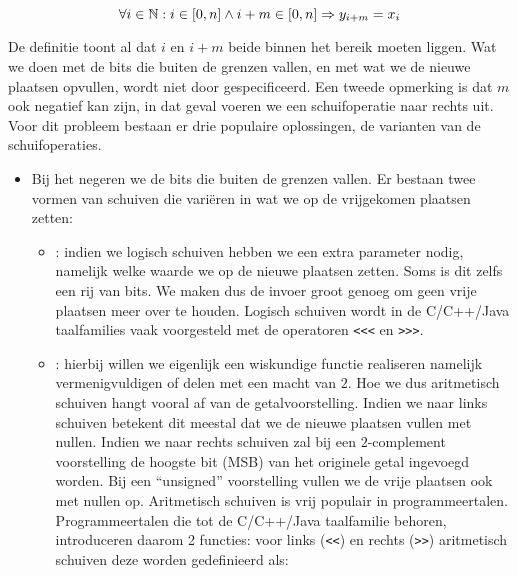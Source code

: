 \begin{equation}
\forall i\in\NN:i\in\left[0,n\right]\wedge i+m\in\left[0,n\right]\Rightarrow y_{i+m}=x_i
\eqnlab{shiftFormal}
\end{equation}

De definitie toont al dat $i$ en $i+m$ beide binnen het bereik moeten liggen. Wat we doen met de bits die buiten de grenzen vallen, en met wat we de nieuwe plaatsen opvullen, wordt niet door  gespecificeerd. Een tweede opmerking is dat $m$ ook negatief kan zijn, in dat geval voeren we een schuifoperatie naar rechts uit. Voor dit probleem bestaan er drie populaire oplossingen, de varianten van de schuifoperaties.
\begin{itemize}
 \item Bij het  negeren we de bits die buiten de grenzen vallen. Er bestaan twee vormen van schuiven die vari\"eren in wat we op de vrijgekomen plaatsen zetten:
 \begin{itemize}
   \item {}: indien we logisch schuiven hebben we een extra parameter nodig, namelijk welke waarde we op de nieuwe plaatsen zetten. Soms is dit zelfs een rij van bits. We maken dus de invoer groot genoeg om geen vrije plaatsen meer over te houden. Logisch schuiven wordt in de C/C++/Java taalfamilies vaak voorgesteld met de operatoren \verb+<<<+ en \verb+>>>+.
   \item {}: hierbij willen we eigenlijk een wiskundige functie realiseren namelijk vermenigvuldigen of delen met een macht van $2$. Hoe we dus aritmetisch schuiven hangt vooral af van de getalvoorstelling. Indien we naar links schuiven betekent dit meestal dat we de nieuwe plaatsen vullen met nullen. Indien we naar rechts schuiven zal bij een $2$-complement voorstelling de hoogste bit (MSB) van het originele getal ingevoegd worden. Bij een ``unsigned'' voorstelling vullen we de vrije plaatsen ook met nullen op. Aritmetisch schuiven is vrij populair in programmeertalen. Programmeertalen die tot de C/C++/Java taalfamilie behoren, introduceren daarom 2 functies: voor links (\verb+<<+) en rechts (\verb+>>+) aritmetisch schuiven deze worden gedefinieerd als:


\end{itemize}
\end{itemize}
